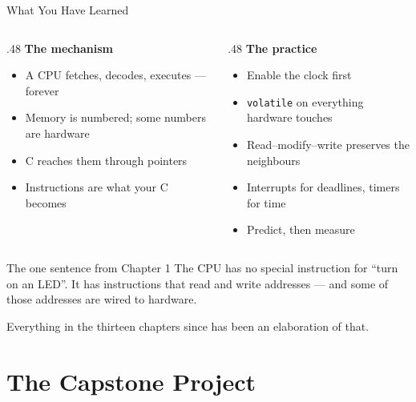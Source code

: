 \documentclass[9pt,aspectratio=169,xcolor=table]{beamer}
\begin{document}
\begin{frame}{What You Have Learned}
    \begin{columns}[T]
    \begin{column}{.48\textwidth}
        \textbf{The mechanism}
        {\small
        \begin{itemize}\itemsep1pt
            \item A CPU fetches, decodes, executes --- forever
            \item Memory is numbered; some numbers are hardware
            \item C reaches them through \alert{pointers}
            \item Instructions are what your C becomes
        \end{itemize}}
    \end{column}
    \begin{column}{.48\textwidth}
        \textbf{The practice}
        {\small
        \begin{itemize}\itemsep1pt
            \item Enable the clock first
            \item \texttt{volatile} on everything hardware touches
            \item Read--modify--write preserves the neighbours
            \item Interrupts for deadlines, timers for time
            \item \alert{Predict, then measure}
        \end{itemize}}
    \end{column}
    \end{columns}

    \vspace{3mm}
    \begin{block}{The one sentence from Chapter 1}
        \alert{The CPU has no special instruction for ``turn on an LED''.} It has
        instructions that read and write addresses --- and some of those addresses
        are wired to hardware.

        \vspace{1mm}
        Everything in the thirteen chapters since has been an elaboration of that.
    \end{block}
\end{frame}


\section{The Capstone Project}
\end{document}
